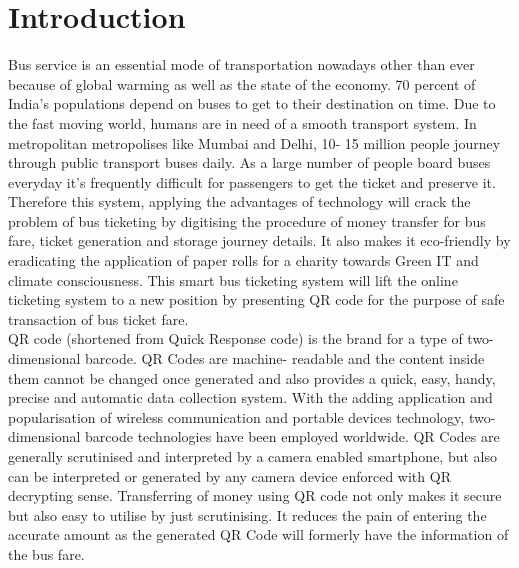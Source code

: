 
\section{Introduction}
Bus service is an essential mode of transportation nowadays other than ever because of global warming as well as the state of the economy. 70 percent of India’s populations depend on buses to get to their destination on time. Due to the fast moving world, humans are in need of a smooth transport system. In metropolitan metropolises like Mumbai and Delhi, 10- 15 million people journey through public transport buses daily. As a large number of people board buses everyday it's frequently difficult for passengers to get the ticket and preserve it. Therefore this system, applying the advantages of technology will crack the problem of bus ticketing by digitising the procedure of money transfer for bus fare, ticket generation and storage journey details. It also makes it eco-friendly by eradicating the application of paper rolls for a charity towards Green IT and climate consciousness. This smart bus ticketing system will lift the online ticketing system to a new position by presenting QR code for the purpose of safe transaction of bus ticket fare.
\\

QR code (shortened from Quick Response code) is the brand for a type of two- dimensional barcode. QR Codes are machine- readable and the content inside them cannot be changed once generated and also provides a quick, easy, handy, precise and automatic data collection system. With the adding application and popularisation of wireless communication and portable devices technology, two- dimensional barcode technologies have been employed worldwide. QR Codes are generally scrutinised and interpreted by a camera enabled smartphone, but also can be interpreted or generated by any camera device enforced with QR decrypting sense. Transferring of money using QR code not only makes it secure but also easy to utilise by just scrutinising. It reduces the pain of entering the accurate amount as the generated QR Code will formerly have the information of the bus fare.
\\

